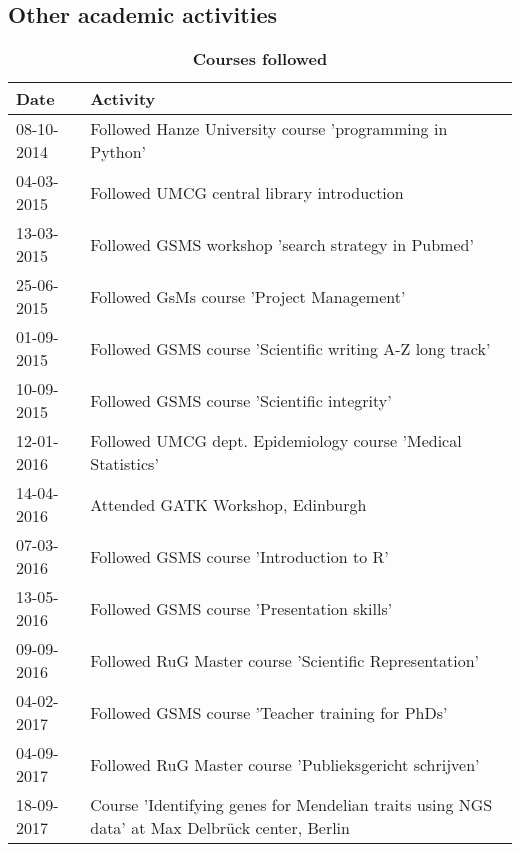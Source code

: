 \begin{appendices}
	\chapter{Other academic activities}
	
	\begin{table}
	\caption*{\textbf{Courses followed}}
		\footnotesize
		\begin{tabulary}{\linewidth}{LL}
			Date & Activity \\
			\hline
			\rule{0pt}{2.6ex}\mbox{08-10-2014} & Followed Hanze University course 'programming in Python'  \\
			\rule{0pt}{2.6ex}\mbox{04-03-2015} & Followed UMCG central library introduction \\
			\rule{0pt}{2.6ex}\mbox{13-03-2015} & Followed GSMS workshop 'search strategy in Pubmed'\\
			\rule{0pt}{2.6ex}\mbox{25-06-2015} & Followed GsMs course 'Project Management' \\
			\rule{0pt}{2.6ex}\mbox{01-09-2015} & Followed GSMS course 'Scientific writing A-Z long track' \\
			\rule{0pt}{2.6ex}\mbox{10-09-2015} & Followed GSMS course 'Scientific integrity'\\
			\rule{0pt}{2.6ex}\mbox{12-01-2016} & Followed UMCG dept. Epidemiology course 'Medical Statistics'\\
			\rule{0pt}{2.6ex}\mbox{14-04-2016} & Attended GATK Workshop, Edinburgh\\
			\rule{0pt}{2.6ex}\mbox{07-03-2016} & Followed GSMS course 'Introduction to R'\\
			\rule{0pt}{2.6ex}\mbox{13-05-2016} & Followed GSMS course 'Presentation skills'\\
			\rule{0pt}{2.6ex}\mbox{09-09-2016} & Followed RuG Master course 'Scientific Representation'\\
			\rule{0pt}{2.6ex}\mbox{04-02-2017} & Followed GSMS course 'Teacher training for PhDs'\\
			\rule{0pt}{2.6ex}\mbox{04-09-2017} & Followed RuG Master course 'Publieksgericht schrijven'\\
			\rule{0pt}{2.6ex}\mbox{18-09-2017} & Course 'Identifying genes for Mendelian traits using NGS data' at Max Delbrück center, Berlin\\
			\hline
		\end{tabulary}
\label{table:appendix_activities_1}
\end{table}			
			


\end{appendices}
